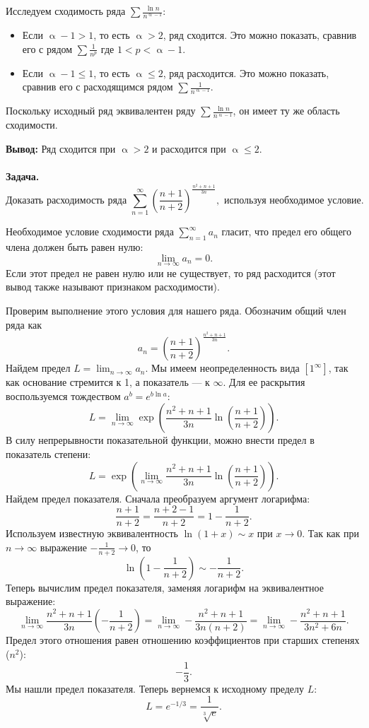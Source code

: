 \documentclass[a4paper, 12pt]{report}
\numberwithin{equation}{section}
\renewcommand{\alpha}{\upalpha}
\begin{document}
	Исследуем сходимость ряда $\sum \frac{\ln n}{n^{\alpha-1}}$:
	\begin{itemize}
		\item Если $\alpha-1 > 1$, то есть $\alpha > 2$, ряд сходится. Это можно показать, сравнив его с рядом $\sum \frac{1}{n^p}$ где $1 < p < \alpha-1$.
		\item Если $\alpha-1 \le 1$, то есть $\alpha \le 2$, ряд расходится. Это можно показать, сравнив его с расходящимся рядом $\sum \frac{1}{n^{\alpha-1}}$.
	\end{itemize}
	Поскольку исходный ряд эквивалентен ряду $\sum \frac{\ln n}{n^{\alpha-1}}$, он имеет ту же область сходимости.
	
	\textbf{Вывод:} Ряд сходится при $\alpha > 2$ и расходится при $\alpha \le 2$.
	\\\\
	\textbf{Задача.}
	$$\text{Доказать расходимость ряда } \sum_{n=1}^{\infty} \left(\frac{n+1}{n+2}\right)^{\frac{n^2+n+1}{3n}}, \text{ используя необходимое условие.}$$
	
	Необходимое условие сходимости ряда $\sum_{n=1}^{\infty} a_n$ гласит, что предел его общего члена должен быть равен нулю:
	$$ \lim_{n \to \infty} a_n = 0. $$
	Если этот предел не равен нулю или не существует, то ряд расходится (этот вывод также называют признаком расходимости).
	
	Проверим выполнение этого условия для нашего ряда. Обозначим общий член ряда как
	$$ a_n = \left(\frac{n+1}{n+2}\right)^{\frac{n^2+n+1}{3n}}. $$
	Найдем предел $L = \lim_{n \to \infty} a_n$. Мы имеем неопределенность вида $\left[1^{\infty}\right]$, так как основание стремится к 1, а показатель — к $\infty$. Для ее раскрытия воспользуемся тождеством $a^b = e^{b \ln a}$:
	$$ L = \lim_{n \to \infty} \exp\left( \frac{n^2+n+1}{3n} \ln\left(\frac{n+1}{n+2}\right) \right). $$
	В силу непрерывности показательной функции, можно внести предел в показатель степени:
	$$ L = \exp\left( \lim_{n \to \infty} \frac{n^2+n+1}{3n} \ln\left(\frac{n+1}{n+2}\right) \right). $$
	Найдем предел показателя. Сначала преобразуем аргумент логарифма:
	$$ \frac{n+1}{n+2} = \frac{n+2-1}{n+2} = 1 - \frac{1}{n+2}. $$
	Используем известную эквивалентность $\ln(1+x) \sim x$ при $x \to 0$. Так как при $n \to \infty$ выражение $-\frac{1}{n+2} \to 0$, то
	$$ \ln\left(1 - \frac{1}{n+2}\right) \sim -\frac{1}{n+2}. $$
	Теперь вычислим предел показателя, заменяя логарифм на эквивалентное выражение:
	$$ \lim_{n \to \infty} \frac{n^2+n+1}{3n} \left(-\frac{1}{n+2}\right) = \lim_{n \to \infty} -\frac{n^2+n+1}{3n(n+2)} = \lim_{n \to \infty} -\frac{n^2+n+1}{3n^2+6n}. $$
	Предел этого отношения равен отношению коэффициентов при старших степенях ($n^2$):
	$$ -\frac{1}{3}. $$
	Мы нашли предел показателя. Теперь вернемся к исходному пределу $L$:
	$$ L = e^{-1/3} = \frac{1}{\sqrt[3]{e}}. $$
	
\end{document}
